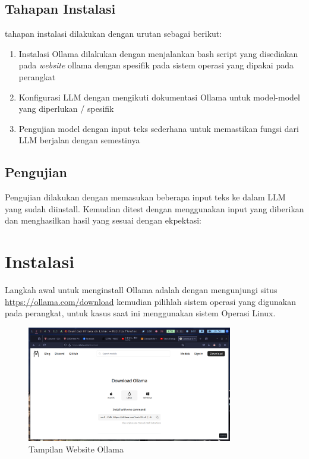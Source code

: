 \documentclass[a4paper,12pt, bahasa]{article}
\begin{document}
\subsection{Tahapan Instalasi}
tahapan instalasi dilakukan dengan urutan sebagai berikut:
\begin{enumerate}
  \item Instalasi Ollama dilakukan dengan menjalankan bash script yang disediakan pada \textit{website} ollama dengan spesifik pada sistem operasi yang dipakai pada perangkat
  \item Konfigurasi LLM dengan mengikuti dokumentasi Ollama untuk model-model yang diperlukan / spesifik
  \item Pengujian model dengan input teks sederhana untuk memastikan fungsi dari LLM berjalan dengan semestinya
\end{enumerate}

\subsection{Pengujian}
Pengujian dilakukan dengan memasukan beberapa input teks ke dalam LLM yang sudah diinstall. Kemudian ditest dengan menggunakan input yang diberikan dan menghasilkan hasil yang sesuai dengan ekpektasi:

\section{Instalasi}

Langkah awal untuk menginstall Ollama adalah dengan mengunjungi situs \url{https://ollama.com/download} kemudian pilihlah sistem operasi yang digunakan pada perangkat, untuk kasus saat ini menggunakan sistem Operasi Linux. 

\begin{figure}[H]
  \begin{center}
    \includegraphics[width=0.80\textwidth]{images/gambar1.png}
    \caption{Tampilan Website Ollama}
  \end{center}
\end{figure}
\end{document}
